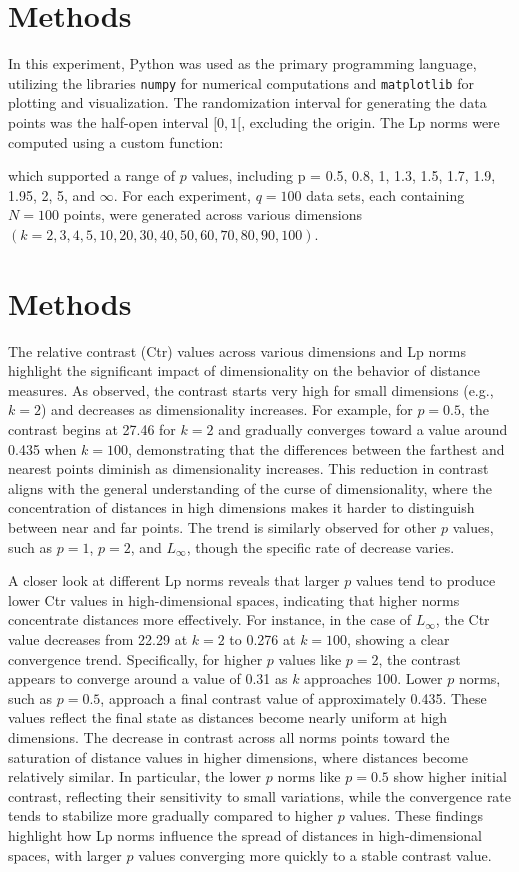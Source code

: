 \documentclass{article}
\begin{document}
\section{Methods}
In this experiment, Python was used as the primary programming language, utilizing the libraries \texttt{numpy} for numerical computations and \texttt{matplotlib} for plotting and visualization. The randomization interval for generating the data points was the half-open interval \([0,1[\), excluding the origin. The Lp norms were computed using a custom function:



which supported a range of \(p\) values, including p = 0.5, 0.8, 1, 1.3, 1.5, 1.7, 1.9, 1.95, 2, 5, and \(\infty\). For each experiment, \(q = 100\) data sets, each containing \(N = 100\) points, were generated across various dimensions \((k = 2, 3, 4, 5, 10, 20, 30, 40, 50, 60, 70, 80, 90, 100)\).

\section{\textbf{Methods}}
The relative contrast (Ctr) values across various dimensions and Lp norms highlight the significant impact of dimensionality on the behavior of distance measures. As observed, the contrast starts very high for small dimensions (e.g., $k=2$) and decreases as dimensionality increases. For example, for $p=0.5$, the contrast begins at 27.46 for $k=2$ and gradually converges toward a value around 0.435 when $k=100$, demonstrating that the differences between the farthest and nearest points diminish as dimensionality increases. This reduction in contrast aligns with the general understanding of the curse of dimensionality, where the concentration of distances in high dimensions makes it harder to distinguish between near and far points. The trend is similarly observed for other $p$ values, such as $p=1$, $p=2$, and $L_{\infty}$, though the specific rate of decrease varies.

A closer look at different Lp norms reveals that larger $p$ values tend to produce lower Ctr values in high-dimensional spaces, indicating that higher norms concentrate distances more effectively. For instance, in the case of $L_{\infty}$, the Ctr value decreases from 22.29 at $k=2$ to 0.276 at $k=100$, showing a clear convergence trend. Specifically, for higher $p$ values like $p=2$, the contrast appears to converge around a value of 0.31 as $k$ approaches 100. Lower $p$ norms, such as $p=0.5$, approach a final contrast value of approximately 0.435. These values reflect the final state as distances become nearly uniform at high dimensions. The decrease in contrast across all norms points toward the saturation of distance values in higher dimensions, where distances become relatively similar. In particular, the lower $p$ norms like $p=0.5$ show higher initial contrast, reflecting their sensitivity to small variations, while the convergence rate tends to stabilize more gradually compared to higher $p$ values. These findings highlight how Lp norms influence the spread of distances in high-dimensional spaces, with larger $p$ values converging more quickly to a stable contrast value.
\end{document}
